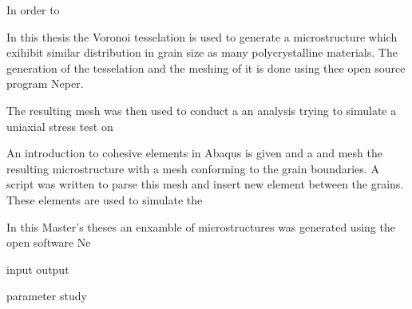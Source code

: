 \documentclass[introduction.tex]{subfiles}
\begin{document}
In order to  

In this thesis the Voronoi tesselation is used to generate a microstructure which exihibit similar distribution in grain size as many polycrystalline materials. 
The generation of the tesselation and the meshing of it is done using thee open source program Neper.

The resulting mesh was then used to conduct a an analysis trying to simulate a uniaxial stress test on

An introduction to cohesive elements in Abaqus is given and a 
 and mesh the resulting microstructure with a mesh conforming to the grain boundaries. A script was written to parse this mesh
 and insert new element between the grains. These elements are used to simulate the 


In this Master's theses an enxamble of microstructures was generated using the open software Ne

input
output

parameter study
\end{document}
